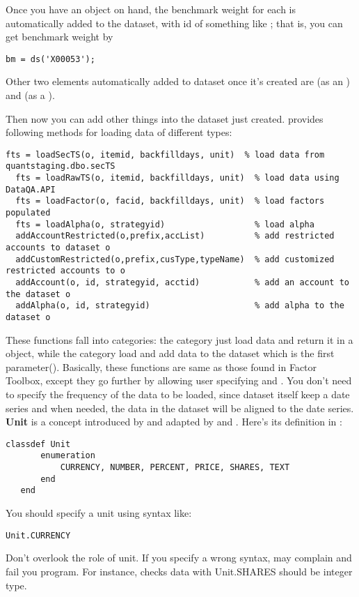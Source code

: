 Once you have an  object on hand, the benchmark weight for each 
is automatically added to the dataset, with id of something like ;
that is, you can get benchmark weight by
\begin{lstlisting}[numbers=none]
  bm = ds('X00053');
\end{lstlisting}

Other two elements automatically added to dataset once it's created are  (as an )
and  (as a ).

Then now you can add other things into the dataset just created. 
 provides following methods for loading data of different types:

\begin{lstlisting}[numbers=none]
  fts = loadSecTS(o, itemid, backfilldays, unit)  % load data from quantstaging.dbo.secTS
  fts = loadRawTS(o, itemid, backfilldays, unit)  % load data using DataQA.API 
  fts = loadFactor(o, facid, backfilldays, unit)  % load factors populated
  fts = loadAlpha(o, strategyid)                  % load alpha
  addAccountRestricted(o,prefix,accList)          % add restricted accounts to dataset o
  addCustomRestricted(o,prefix,cusType,typeName)  % add customized restricted accounts to o
  addAccount(o, id, strategyid, acctid)           % add an account to the dataset o
  addAlpha(o, id, strategyid)                     % add alpha to the dataset o
\end{lstlisting}

These functions fall into categories: the  category just load data and return it in a \myfints{} object,
while the  category load and add data to the dataset which is the first parameter().
Basically, these functions are same as those found in Factor Toolbox, except they go further
by allowing user specifying  and .
You don't need to specify the frequency of the data to be loaded,
since dataset itself keep a date series and when needed, the data in the dataset will be aligned to the date series.
\textbf{Unit} is a concept introduced by \axioma{} and adapted by  and .
Here's its definition in \matlab{}:
\begin{lstlisting}[numbers=none]
   classdef Unit
       enumeration
           CURRENCY, NUMBER, PERCENT, PRICE, SHARES, TEXT
       end
   end
\end{lstlisting}
You should specify a unit using syntax like: 
\begin{lstlisting}[numbers=none]
   Unit.CURRENCY
\end{lstlisting}
Don't overlook the role of unit. If you specify a wrong syntax, \axioma{} may complain and fail you program.
For instance, \axioma{} checks data with Unit.SHARES should be integer type.

